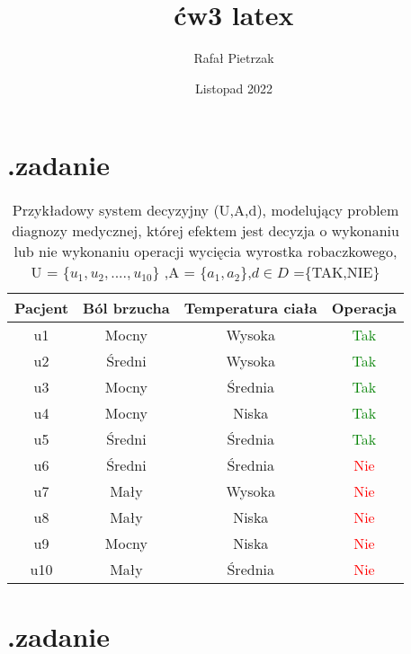 \documentclass[12pt, letterpaper, titlepage]{article}
\title{ćw3 latex}
\author{Rafał Pietrzak}
\date{Listopad 2022}
\begin{document}
\maketitle

\section{.zadanie}

\begin{table}[h]
\centering\caption{Przykładowy system decyzyjny (U,A,d), modelujący problem diagnozy medycznej, której efektem jest decyzja o wykonaniu lub nie wykonaniu operacji wycięcia wyrostka robaczkowego, U = \{$u_{1},u_{2},....,u_{10}$\} ,A = \{$a_{1},a_{2}$\},$d\in D$ =\{TAK,NIE\}}
\begin{tabular}{c|c c c}
\hline
\hline
Pacjent & Ból brzucha & Temperatura ciała & Operacja\\
\hline
u1 & Mocny & Wysoka & \textcolor{green}{Tak}\\

u2 & Średni & Wysoka & \textcolor{green}{Tak}\\

u3 & Mocny & Średnia & \textcolor{green}{Tak}\\

u4 & Mocny & Niska & \textcolor{green}{Tak}\\

u5 & Średni & Średnia &  \textcolor{green}{Tak}\\

u6 & Średni & Średnia & \textcolor{red}{Nie} \\

u7 & Mały & Wysoka & \textcolor{red}{Nie}\\

u8 & Mały & Niska & \textcolor{red}{Nie}\\

u9 & Mocny & Niska & \textcolor{red}{Nie}\\

u10 & Mały & Średnia & \textcolor{red}{Nie}\\
\hline
\hline

\end{tabular}
\end{table}


\newpage
\section{.zadanie}
\end{document}
